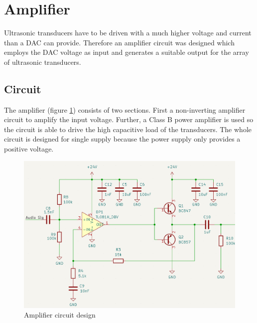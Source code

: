 \section{Amplifier}\label{sec:pcb:amp}


Ultrasonic transducers have to be driven with a much higher voltage and current than a DAC can provide. Therefore an amplifier circuit was designed which employs the DAC voltage as input and generates a suitable output for the array of ultrasonic transducers.

\subsection{Circuit}

The amplifier (figure \ref{fig:pcb:amp_circuit}) consists of two sections. First a non-inverting amplifier circuit to amplify the input voltage. Further, a Class B power amplifier is used so the circuit is able to drive the high capacitive load of the transducers. The whole circuit is designed for single supply because the power supply only provides a positive voltage.

\begin{figure}
  \centering
  \includegraphics[height=\largeheight]{src/assets/pictures/circuit/amp_circuit.png}
  \caption{Amplifier circuit design}\label{fig:pcb:amp_circuit}
\end{figure}

